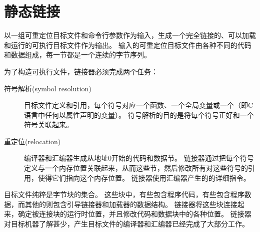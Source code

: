 
\section{静态链接}
{
    以一组可重定位目标文件和命令行参数作为输入，生成一个完全链接的、可以加载和运行的可执行目标文件作为输出。
    输入的可重定位目标文件由各种不同的代码和数据组成，每一节都是一个连续的字节序列。

    为了构造可执行文件，链接器必须完成两个任务：

    \begin{description}
        \item[符号解析(symbol resolution)]
        {
            目标文件定义和引用，每个符号对应一个函数、一个全局变量或一个（即C语言中任何以属性声明的变量）。
            符号解析的目的是将每个符号正好和一个符号关联起来。
        }
        \item[重定位(relocation)]
        {
            编译器和汇编器生成从地址0开始的代码和数据节。
            链接器通过把每个符号定义与一个内存位置关联起来，从而这些节，然后修改所有对这些符号的引用，使得它们指向这个内存位置。
            链接器使用汇编器产生的的详细指令。
        }
    \end{description}

    目标文件纯粹是字节块的集合。
    这些块中，有些包含程序代码，有些包含程序数据，而其他的则包含引导链接器和加载器的数据结构。
    链接器将这些块连接起来，确定被连接块的运行时位置，并且修改代码和数据块中的各种位置。
    链接器对目标机器了解甚少，产生目标文件的编译器和汇编器已经完成了大部分工作。
}
